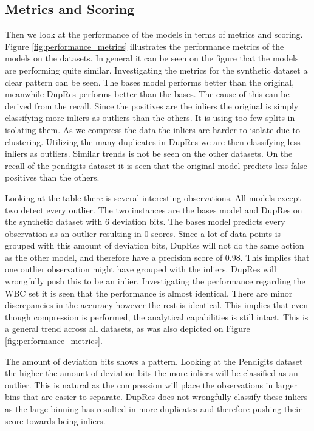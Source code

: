 \subsection{Metrics and Scoring}
Then we look at the performance of the models in terms of metrics and scoring. Figure \ref{fig:performance_metrics} illustrates the performance metrics of the models on the datasets. In general it can be seen on the figure that the models are performing quite similar. Investigating the metrics for the synthetic dataset a clear pattern can be seen. The bases model performs better than the original, meanwhile DupRes performs better than the bases. The cause of this can be derived from the recall. Since the positives are the inliers the original is simply classifying more inliers as outliers than the others. It is using too few splits in isolating them. As we compress the data the inliers are harder to isolate due to clustering. Utilizing the many duplicates in DupRes we are then classifying less inliers as outliers. Similar trends is not be seen on the other datasets. On the recall of the pendigits dataset it is seen that the original model predicts less false positives than the others.

Looking at the table there is several interesting observations. All models except two detect every outlier. The two instances are the bases model and DupRes on the synthetic dataset with 6 deviation bits. The bases model predicts every observation as an outlier resulting in 0 scores. Since a lot of data points is grouped with this amount of deviation bits, DupRes will not do the same action as the other model, and therefore have a precision score of 0.98. This implies that one outlier observation might have grouped with the inliers. DupRes will wrongfully push this to be an inlier. Investigating the performance regarding the WBC set it is seen that the performance is almost identical. There are minor discrepancies in the accuracy however the rest is identical. This implies that even though compression is performed, the analytical capabilities is still intact. This is a general trend across all datasets, as was also depicted on Figure \ref{fig:performance_metrics}.

The amount of deviation bits shows a pattern. Looking at the Pendigits dataset the higher the amount of deviation bits the more inliers will be classified as an outlier. This is natural as the compression will place the observations in larger bins that are easier to separate. DupRes does not wrongfully classify these inliers as the large binning has resulted in more duplicates and therefore pushing their score towards being inliers.

